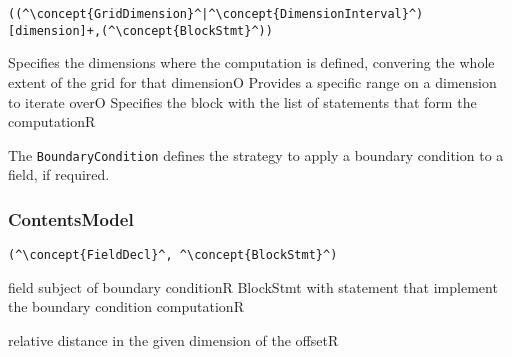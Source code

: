 \begin{lstlisting}[style=default]
((^\concept{GridDimension}^|^\concept{DimensionInterval}^)[dimension]+,(^\concept{BlockStmt}^))
\end{lstlisting}

\begin{HIRChildElements}
	{Specifies the dimensions where the computation is defined, 
		convering the whole extent of the grid for that dimension}{O}
	{Provides a specific range on a dimension to iterate over}{O}
	{Specifies the block with the list of statements that form the computation}{R}
\end{HIRChildElements}


The {\tt BoundaryCondition} defines the strategy to apply a boundary condition to a field, if required.

\subsubsection*{ContentsModel}{}

\begin{lstlisting}[style=default]
(^\concept{FieldDecl}^, ^\concept{BlockStmt}^)
\end{lstlisting}

\begin{HIRChildElements}
	{field subject of boundary condition}{R}
	{BlockStmt with statement that implement the boundary condition computation}{R}
		
\end{HIRChildElements}

\begin{HIRAttributes}
	{relative distance in the given dimension of the offset}{R}
\end{HIRAttributes}
